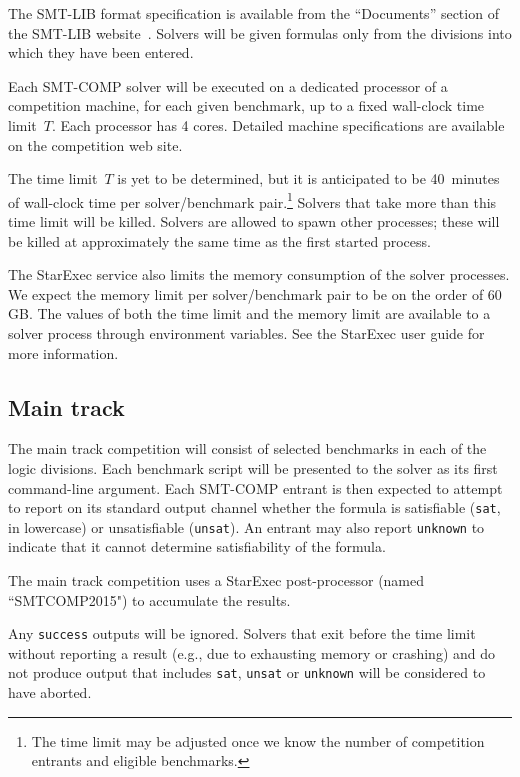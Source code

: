 \documentclass[12pt]{article}
\begin{document}
%
The SMT-LIB format specification is available from the ``Documents''
section of the SMT-LIB website~\cite{SMT-LIB}.  Solvers will be given
formulas only from the divisions into which they have been entered.

%
Each SMT-COMP solver will be executed on a dedicated processor of a
competition machine, for each given benchmark, up to a fixed
wall-clock time limit~$T$.  Each processor has 4 cores.  Detailed
machine specifications are available on the competition web site.

The time limit~$T$ is yet to be determined, but it is anticipated to
be 40~minutes of wall-clock time per solver/benchmark
pair.\footnote{The time limit may be adjusted once we know the number
  of competition entrants and eligible benchmarks.}  Solvers that take
more than this time limit will be killed.  Solvers are allowed to
spawn other processes; these will be killed at approximately the same
time as the first started process.

The StarExec service also limits the memory consumption of the solver
processes.  We expect the memory limit per solver/benchmark pair to be
on the order of 60\,GB.  The values of both the time limit and the
memory limit are available to a solver process through environment
variables.  See the StarExec user guide for more information.

\subsection{Main track}
\label{sec:exec:main}

The main track competition will consist of selected benchmarks in each
of the logic divisions.  Each benchmark script will be presented to
the solver as its first command-line argument.  Each SMT-COMP entrant
is then expected to attempt to report on its standard output channel
whether the formula is satisfiable (\texttt{sat}, in lowercase) or
unsatisfiable (\texttt{unsat}).  An entrant may also report
\texttt{unknown} to indicate that it cannot determine satisfiability
of the formula.

The main track competition uses a StarExec post-processor (named
``SMTCOMP2015") to accumulate the results.

%
Any \texttt{success} outputs will be ignored.  Solvers that exit
before the time limit without reporting a result (e.g., due to
exhausting memory or crashing) and do not produce output that includes
\texttt{sat}, \texttt{unsat} or \texttt{unknown} will be considered to
have aborted.
\end{document}
